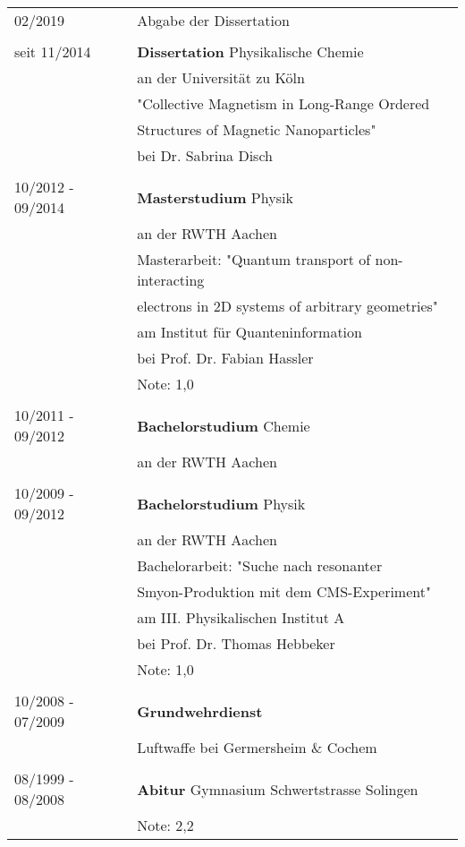 \documentclass[\main/dresen_thesis.tex]{subfiles}
\begin{document}
	\begin{table}[H]
		\begin{tabular}{p{5cm}l}
			02/2019						& Abgabe der Dissertation\\ \\

			seit 11/2014 			& \textbf{Dissertation} Physikalische Chemie\\
												& an der Universität zu Köln \\
												& "Collective Magnetism in Long-Range Ordered\\
												&  Structures of Magnetic Nanoparticles"\\
												& bei Dr. Sabrina Disch \\ \\

			10/2012 - 09/2014 & \textbf{Masterstudium} Physik \\
												& an der RWTH Aachen \\
												& Masterarbeit: "Quantum transport of non-interacting\\
												& electrons in 2D systems of arbitrary geometries" \\
												& am Institut f\"ur Quanteninformation\\
												& bei Prof. Dr. Fabian Hassler\\
												& Note: 1,0\\ \\

			10/2011 - 09/2012 & \textbf{Bachelorstudium} Chemie \\
												& an der RWTH Aachen  \\ \\

			10/2009 - 09/2012 & \textbf{Bachelorstudium} Physik \\
											  & an der RWTH Aachen  \\
												& Bachelorarbeit: "Suche nach resonanter \\
												& Smyon-Produktion mit dem CMS-Experiment"\\
												& am III. Physikalischen Institut A\\
												& bei Prof. Dr. Thomas Hebbeker\\
												& Note: 1,0\\ \\

			10/2008 - 07/2009 & \textbf{Grundwehrdienst} \\
												& Luftwaffe bei Germersheim \& Cochem \\ \\

			08/1999 - 08/2008 & \textbf{Abitur} Gymnasium Schwertstrasse Solingen \\
												& Note: 2,2\\
			\end{tabular}
	\end{table}
\end{document}

